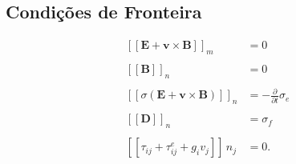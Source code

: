 \subsection{Condi\c{c}\~oes de Fronteira}

\begin{align*}
\left[\left[\mathbf{E}+\mathbf{v}\times\mathbf{B}\right]\right]_m&=0\\\\
\left[\left[\mathbf{B}\right]\right]_n&=0\\\\
\left[\left[\sigma(\mathbf{E}+\mathbf{v}\times\mathbf{B})\right]\right]_n&=-\frac{\partial}{\partial t}\sigma_e\\\\
\left[\left[\mathbf{D}\right]\right]_n&=\sigma_f\\\\
\left[\left[\tau_{ij}+\tau^e_{ij}+g_iv_j\right]\right]\,n_j&=0.
\end{align*}
